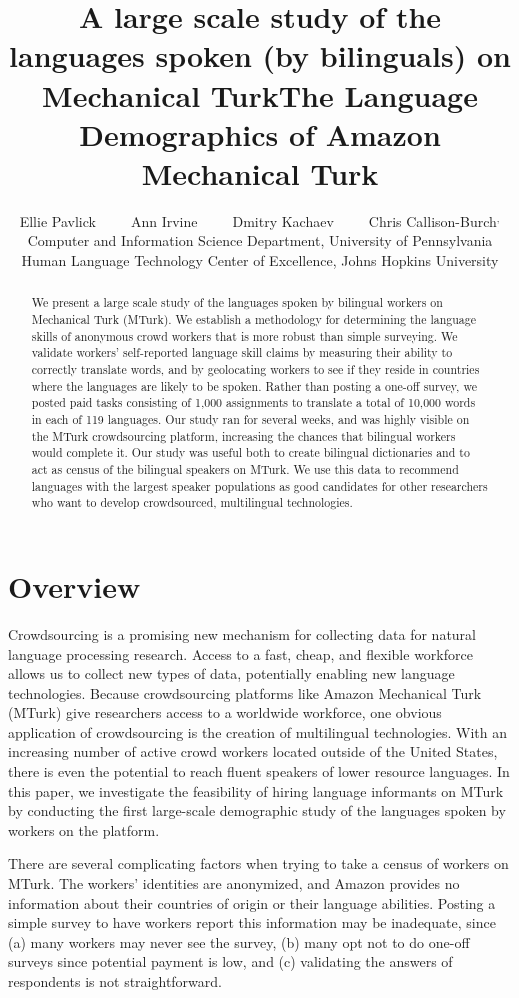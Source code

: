 \documentclass[11pt]{article}
\title{A large scale study of the languages spoken (by bilinguals) on Mechanical Turk}
\title{The Language Demographics of  Amazon Mechanical Turk}
\author{Ellie Pavlick\affliationPenn \ \ \ \ \ Ann Irvine\affliationJHU  \ \ \ \ \ Dmitry Kachaev\affliationJHU  \ \ \ \ \  Chris Callison-Burch\affliationPenn$^{,}$\affliationJHU \\
\affliationPenn Computer and Information Science Department, University of Pennsylvania \\
\affliationJHU Human Language Technology Center of Excellence, Johns Hopkins University \\
  }
\author{}
\date{}
\begin{document}
\maketitle

\begin{abstract}
We present a large scale study of the languages spoken by bilingual workers on Mechanical Turk (MTurk).  
We establish a  methodology for determining the language skills of anonymous crowd workers that is more robust than simple surveying.  We validate workers' self-reported language skill claims by measuring their ability to correctly translate words, and by geolocating workers to see if they reside in countries where the languages are likely to be spoken. Rather than posting a one-off survey, we posted paid tasks consisting of 1,000 assignments to translate a total of 10,000 words in each of 119 languages.  Our study ran for several weeks, and was highly visible on the MTurk crowdsourcing platform, increasing the chances that bilingual workers would complete it.  Our study was useful both to create bilingual dictionaries and to act as census of the bilingual speakers on MTurk.  We use this data to recommend languages with the largest speaker populations as good candidates for other researchers who want to  develop crowdsourced, multilingual technologies.

\end{abstract}

\section{Overview}
Crowdsourcing is a promising new mechanism for collecting data for natural language processing research. Access to a fast, cheap, and flexible workforce allows us to collect new types of data, potentially enabling new language technologies.
Because crowdsourcing platforms like Amazon Mechanical Turk (MTurk) give researchers access to a worldwide workforce, one obvious application of crowdsourcing is the creation of multilingual technologies. 
With an increasing number of active crowd workers located outside of the United States, there is even the potential to reach fluent speakers of lower resource languages.
In this paper, we investigate the feasibility of hiring language informants on MTurk by conducting the first large-scale demographic study of the languages spoken by workers on the platform. 

There are several complicating factors when trying to take a census of workers on MTurk.  The workers' identities are anonymized, and Amazon provides no information about their countries of origin or their language abilities.  Posting a simple survey to have workers report this information may be inadequate, since (a) many workers may never see the survey, (b) many opt not to do one-off surveys since potential payment is low, and (c) validating the answers of respondents is not straightforward. 
\end{document}
